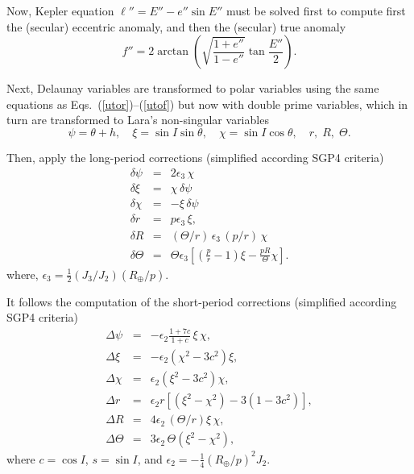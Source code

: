 \documentclass{article}
\begin{document}
Now, Kepler equation $\ell''=E''-e''\sin{E}''$ must be solved first to compute first the (secular) eccentric anomaly, and then the (secular) true anomaly
\[
f''=2\arctan\left(\sqrt{\frac{1+e''}{1-e''}}\tan\frac{E''}{2}\right).
\]
\par

Next, Delaunay variables are transformed to polar variables using the same equations as Eqs.~(\ref{utor})--(\ref{utof}) but now with double prime variables, which in turn are transformed to Lara's non-singular variables
\[
\psi=\theta+h,\quad \xi=\sin{I}\sin\theta,\quad \chi=\sin{I}\cos\theta,\quad r,\; R,\; \Theta.
\]

Then, apply the long-period corrections (simplified according SGP4 criteria)
\begin{eqnarray*} \label{dyns}
\delta\psi &=& 2\epsilon_3\,\chi
\\  \label{dxins}
\delta\xi &=&  %
\chi\,\delta\psi
\\ \label{dchins}
\delta\chi &=& %
-\xi\,\delta\psi
\\ \label{drns}
\delta{r} &=& p\epsilon_3\,\xi,
\\ \label{dRRns}
\delta{R} &=& %
(\Theta/r)\,\epsilon_3\,(p/r)\,\chi
\\ \label{dZZns}
\delta\Theta &=& \Theta\epsilon_3\left[\left(\frac{p}{r}-1\right)\xi-\frac{p R}{\Theta}\chi\right].
\end{eqnarray*}
where, $\epsilon_3=\frac{1}{2}(J_3/J_2)(R_\oplus/p)$.
\par

It follows the computation of the short-period corrections (simplified according SGP4 criteria)
\begin{eqnarray*}
\Delta\psi &=& -\epsilon_2\frac{1+7c}{1+c}\,\xi\,\chi,
\\
\Delta\xi &=& -\epsilon_2\left(\chi^2-3c^2\right)\xi,
\\[1ex]
\Delta\chi &=& \epsilon_2\left(\xi^2-3c^2\right)\chi,
\\
\Delta{r} &=& %
\epsilon_2r\left[(\xi^2-\chi^2)-3(1-3c^2)\right],
\\
\Delta{R} &=& %
4\epsilon_2\,(\Theta/r)\xi\,\chi,
\\
\Delta\Theta &=&  3\epsilon_2\,\Theta(\xi^2-\chi^2),
\end{eqnarray*}
where $c=\cos{I}$, $s=\sin{I}$, and $\epsilon_2=-\frac{1}{4}(R_\oplus/p)^2J_2$.
\par
\end{document}
